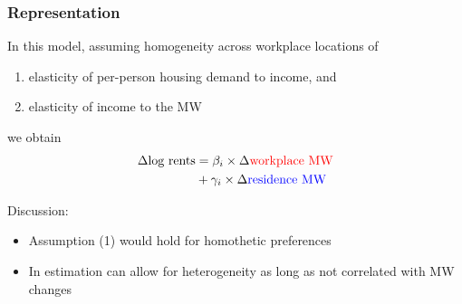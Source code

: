 \documentclass[aspectratio=169, t]{beamer}
\begin{document}
\begin{frame}
\begin{columns}
\begin{column}{0.65\textwidth}
\begin{figure}
                
            \end{figure}
        \end{column}
    \end{columns}

\end{frame}

\begin{frame}
    \frametitle{Representation}

    In this model, assuming homogeneity across workplace locations of
    \begin{enumerate}
        \item elasticity of per-person housing demand to income, and
        \item elasticity of income to the MW
    \end{enumerate}
    we obtain
    \[
    \begin{split}
        \Delta \text{log rents} & = \beta_i  \times \Delta {\color{red}  \text{workplace MW}} \\
                                & + \gamma_i \times \Delta {\color{blue} \text{residence MW}} \\
    \end{split}
    \]

    \vspace{3mm}
    \pause
    Discussion:
    \begin{itemize}
        \item Assumption (1) would hold for homothetic preferences
        \item In estimation can allow for heterogeneity as long as not correlated with MW changes
    \end{itemize}

\end{frame}
\end{document}

